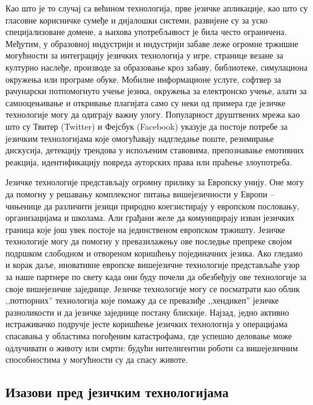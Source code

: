{\begin{multicols}{2}
Као што је то случај са већином технологија, прве језичке апликације, као што су гласовне корисничке сумеђе и дијалошки системи, развијене су за уско специјализоване домене, а њихова употребљивост је била често ограничена. Међутим, у образовној индустрији и индустрији забаве леже огромне тржишне могућности за интеграцију језичких технологија у игре, странице везане за културно наслеђе, производе за образовање кроз забаву, библиотеке, симулациона окружења или програме обуке. Мобилне информационе услуге, софтвер за рачунарски потпомогнуто учење језика, окружења за електронско учење, алати за самооцењивање и откривање плагијата само су неки од примера где језичке технологије могу да одиграју важну улогу. Популарност друштвених мрежа као што су Твитер (Twitter) и Фејсбук (Facebook) указује да постоје потребе за језичким технологијама које омогућавају надгледање поште, резимирање дискусија, детекцију трендова у испољеним ставовима, препознавање емотивних реакција, идентификацију повреда ауторских права или праћење злоупотреба.


Језичке технологије представљају огромну прилику за Европску унију. Оне могу да помогну у решавању комплексног питања вишејезичности у Европи -- чињенице да различити језици природно коегзистирају у европском пословању, организацијама и школама. Али грађани желе да комуницирају изван језичких граница које још увек постоје на јединственом европском тржишту. Језичке технологије могу да помогну у превазилажењу ове последње препреке својом подршком слободном и отвореном коришћењу појединачних језика. Ако гледамо и корак даље, иновативне европске вишејезичне технологије представљаће узор за наше партнере по свету када они буду почели да обезбеђују ове технологије за своје вишејезичне заједнице. Језичке технологије могу се посматрати као облик ,,потпорних'' технологија које помажу да се превазиђе ,,хендикеп'' језичке разноликости и да језичке заједнице постану блискије. Најзад, jедно активно истраживачко подручје  јесте коришћење језичких технологија у операцијама спасавања у областима погођеним  катастрофама, где успешно деловање може одлучивати о животу или смрти: будући интелигентни роботи са вишејезичним способностима у могућности су да спасу животе. 


\subsection{Изазови пред језичким технологијама}
  

\end{multicols}}
